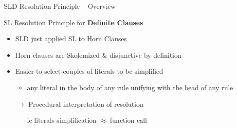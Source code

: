 \documentclass[presentation]{beamer}\mode<presentation>{\usetheme{AMSBolognaFC}}
\begin{document}
\begin{frame}{SLD Resolution Principle -- Overview}
    \begin{alertblock}{SL Resolution Principle for \textbf{Definite Clauses}}
        \begin{itemize}
            \item SLD just applied SL to Horn Clauses
            
            \item Horn clauses are Skolemized \& disjunctive \alert{by definition}
            
            \item Easier to select couples of literals to be simplified
            \begin{itemize}
                \item any literal in the \alert{body} of any rule \alert{unifying} with the \alert{head} of any rule
            \end{itemize}

            \item[$\rightarrow$] Procedural interpretation of resolution
            \begin{itemize}
                \item[ie] literals simplification $\approx$ function call
            \end{itemize}
        \end{itemize}
    \end{alertblock}
\end{frame}
\end{document}
